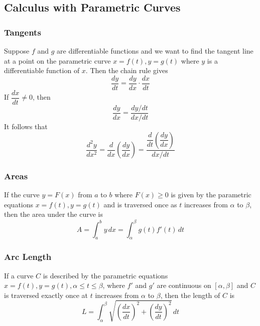\subsection{Calculus with Parametric Curves}

\subsubsection*{Tangents}

Suppose \(f\) and \(g\) are differentiable functions and we want to find the
tangent line at a point on the parametric curve \(x=f(t),y=g(t)\) where \(y\)
is a differentiable function of \(x\).
Then the chain rule gives
\[\frac{dy}{dt}=\frac{dy}{dx}\cdot\frac{dx}{dt}\]
If \(\dfrac{dx}{dt}\neq0\), then
\[\frac{dy}{dx}=\frac{dy/dt}{dx/dt}\]
It follows that
\[\frac{d^2y}{dx^2}=\frac{d}{dx}\left(\frac{dy}{dx}\right)
=\frac{\dfrac{d}{dt}\left(\dfrac{dy}{dx}\right)}{dx/dt}\]

\subsubsection*{Areas}

If the curve \(y=F(x)\) from \(a\) to \(b\) where \(F(x)\geq 0\) is given by
the parametric equations \(x=f(t),y=g(t)\) and is traversed once as \(t\)
increases from \(\alpha\) to \(\beta\), then the area under the curve is
\[A=\int_{a}^{b}y\,dx=\int_{\alpha}^{\beta}g(t)f'(t)\,dt\]

\subsubsection*{Arc Length}

\begin{theorem}
    If a curve \(C\) is described by the parametric equations
    \(x=f(t),y=g(t),\alpha\leq t\leq\beta\), where \(f'\) and \(g'\) are
    continuous on \([\alpha,\beta]\) and \(C\) is traversed exactly once at
    \(t\) increases from \(\alpha\) to \(\beta\), then the length of \(C\) is
    \[L=\int_{\alpha}^{\beta}
    \sqrt{\left(\frac{dx}{dt}\right)^2+\left(\frac{dy}{dt}\right)^2}\,dt\]
\end{theorem}
